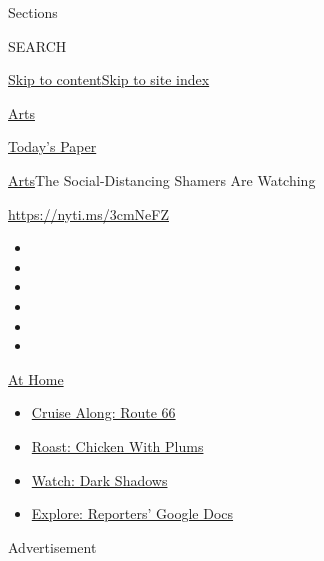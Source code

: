 Sections

SEARCH

\protect\hyperlink{site-content}{Skip to
content}\protect\hyperlink{site-index}{Skip to site index}

\href{https://www.nytimes3xbfgragh.onion/section/arts}{Arts}

\href{https://myaccount.nytimes3xbfgragh.onion/auth/login?response_type=cookie\&client_id=vi}{}

\href{https://www.nytimes3xbfgragh.onion/section/todayspaper}{Today's
Paper}

\href{/section/arts}{Arts}\textbar{}The Social-Distancing Shamers Are
Watching

\url{https://nyti.ms/3cmNeFZ}

\begin{itemize}
\item
\item
\item
\item
\item
\item
\end{itemize}

\href{https://www.nytimes3xbfgragh.onion/spotlight/at-home?action=click\&pgtype=Article\&state=default\&region=TOP_BANNER\&context=at_home_menu}{At
Home}

\begin{itemize}
\tightlist
\item
  \href{https://www.nytimes3xbfgragh.onion/2020/09/07/travel/route-66.html?action=click\&pgtype=Article\&state=default\&region=TOP_BANNER\&context=at_home_menu}{Cruise
  Along: Route 66}
\item
  \href{https://www.nytimes3xbfgragh.onion/2020/09/04/dining/sheet-pan-chicken.html?action=click\&pgtype=Article\&state=default\&region=TOP_BANNER\&context=at_home_menu}{Roast:
  Chicken With Plums}
\item
  \href{https://www.nytimes3xbfgragh.onion/2020/09/04/arts/television/dark-shadows-stream.html?action=click\&pgtype=Article\&state=default\&region=TOP_BANNER\&context=at_home_menu}{Watch:
  Dark Shadows}
\item
  \href{https://www.nytimes3xbfgragh.onion/interactive/2020/at-home/even-more-reporters-editors-diaries-lists-recommendations.html?action=click\&pgtype=Article\&state=default\&region=TOP_BANNER\&context=at_home_menu}{Explore:
  Reporters' Google Docs}
\end{itemize}

Advertisement

